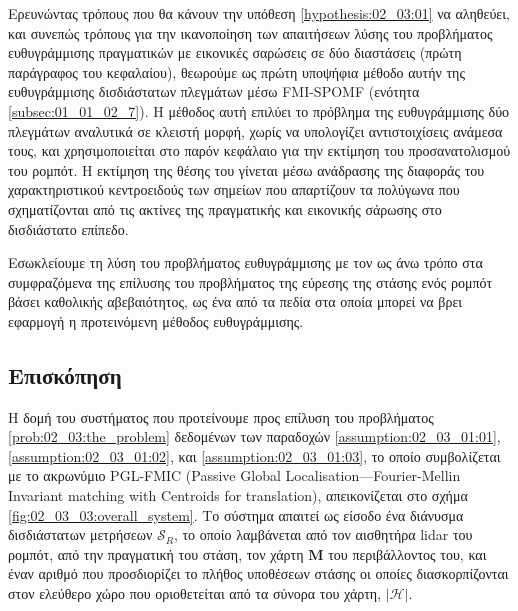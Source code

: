 Ερευνώντας τρόπους που θα κάνουν την υπόθεση \ref{hypothesis:02_03:01} να
αληθεύει, και συνεπώς τρόπους για την ικανοποίηση των απαιτήσεων λύσης του
προβλήματος ευθυγράμμισης πραγματικών με εικονικές σαρώσεις σε δύο διαστάσεις
(πρώτη παράγραφος του κεφαλαίου), θεωρούμε ως πρώτη υποψήφια μέθοδο αυτήν της
ευθυγράμμισης δισδιάστατων πλεγμάτων μέσω FMI-SPOMF (ενότητα
\ref{subsec:01_01_02_7}). Η μέθοδος αυτή επιλύει το πρόβλημα της ευθυγράμμισης
δύο πλεγμάτων αναλυτικά σε κλειστή μορφή, χωρίς να υπολογίζει αντιστοιχίσεις
ανάμεσα τους, και χρησιμοποιείται στο παρόν κεφάλαιο για την εκτίμηση του
προσανατολισμού του ρομπότ. Η εκτίμηση της θέσης του γίνεται μέσω ανάδρασης
της διαφοράς του χαρακτηριστικού κεντροειδούς των σημείων που απαρτίζουν τα
πολύγωνα που σχηματίζονται από τις ακτίνες της πραγματικής και εικονικής
σάρωσης στο δισδιάστατο επίπεδο.

Εσωκλείουμε τη λύση του προβλήματος ευθυγράμμισης με τον ως άνω τρόπο στα
συμφραζόμενα της επίλυσης του προβλήματος της εύρεσης της στάσης ενός ρομπότ
βάσει καθολικής αβεβαιότητος, ως ένα από τα πεδία στα οποία μπορεί να βρει
εφαρμογή η προτεινόμενη μέθοδος ευθυγράμμισης.

\subsection{Επισκόπηση}
\label{subsection:02_03_03:01}

Η δομή του συστήματος που προτείνουμε προς επίλυση του προβλήματος
\ref{prob:02_03:the_problem} δεδομένων των παραδοχών
\ref{assumption:02_03_01:01}, \ref{assumption:02_03_01:02}, και
\ref{assumption:02_03_01:03}, το οποίο συμβολίζεται με το ακρωνύμιο PGL-FMIC
(Passive Global Localisation---Fourier-Mellin Invariant matching with Centroids
for translation), απεικονίζεται στο σχήμα \ref{fig:02_03_03:overall_system}. Το
σύστημα απαιτεί ως είσοδο ένα διάνυσμα δισδιάστατων μετρήσεων $\mathcal{S}_R$,
το οποίο λαμβάνεται από τον αισθητήρα lidar του ρομπότ, από την πραγματική του
στάση, τον χάρτη $\bm{M}$ του περιβάλλοντος του, και έναν αριθμό που
προσδιορίζει το πλήθος υποθέσεων στάσης οι οποίες διασκορπίζονται στον
ελεύθερο χώρο που οριοθετείται από τα σύνορα του χάρτη, $|\mathcal{H}|$.

